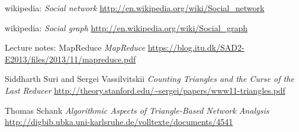 \documentclass{article}
\begin{document}
\begin{thebibliography}{1}

    wikipedia:
    \emph{Social network}
    \url{http://en.wikipedia.org/wiki/Social_network}

    wikipedia:
    \emph{Social graph}
    \url{http://en.wikipedia.org/wiki/Social_graph}

    Lecture notes: MapReduce
    \emph{MapReduce}
    \url{https://blog.itu.dk/SAD2-E2013/files/2013/11/mapreduce.pdf}

    Siddharth Suri and Sergei Vassilvitskii
    \emph{Counting Triangles and the Curse of the Last Reducer}
    \url{http://theory.stanford.edu/~sergei/papers/www11-triangles.pdf}

    Thomas Schank
    \emph{Algorithmic Aspects of Triangle-Based Network Analysis}
    \url{http://digbib.ubka.uni-karlsruhe.de/volltexte/documents/4541}
    
\end{thebibliography}
\end{document}
